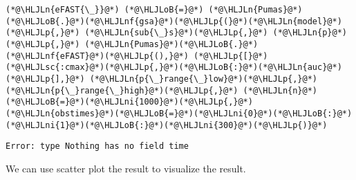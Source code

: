 \documentclass[12pt,a4paper]{article}
\newcommand{\HLJLn}[1]{#1}
\newcommand{\HLJLnf}[1]{\textcolor[RGB]{66,102,213}{#1}}
\newcommand{\HLJLsc}[1]{\textcolor[RGB]{201,61,57}{#1}}
\newcommand{\HLJLni}[1]{\textcolor[RGB]{59,151,46}{#1}}
\newcommand{\HLJLoB}[1]{\textcolor[RGB]{102,102,102}{\textbf{#1}}}
\newcommand{\HLJLp}[1]{#1}
\begin{document}
\begin{lstlisting}
(*@\HLJLn{eFAST{\_}}@*) (*@\HLJLoB{=}@*) (*@\HLJLn{Pumas}@*)(*@\HLJLoB{.}@*)(*@\HLJLnf{gsa}@*)(*@\HLJLp{(}@*)(*@\HLJLn{model}@*)(*@\HLJLp{,}@*) (*@\HLJLn{sub{\_}s}@*)(*@\HLJLp{,}@*) (*@\HLJLn{p}@*)(*@\HLJLp{,}@*) (*@\HLJLn{Pumas}@*)(*@\HLJLoB{.}@*)(*@\HLJLnf{eFAST}@*)(*@\HLJLp{(),}@*) (*@\HLJLp{[}@*)(*@\HLJLsc{:cmax}@*)(*@\HLJLp{,}@*)(*@\HLJLoB{:}@*)(*@\HLJLn{auc}@*)(*@\HLJLp{],}@*) (*@\HLJLn{p{\_}range{\_}low}@*)(*@\HLJLp{,}@*) (*@\HLJLn{p{\_}range{\_}high}@*)(*@\HLJLp{,}@*) (*@\HLJLn{n}@*)(*@\HLJLoB{=}@*)(*@\HLJLni{1000}@*)(*@\HLJLp{,}@*) (*@\HLJLn{obstimes}@*)(*@\HLJLoB{=}@*)(*@\HLJLni{0}@*)(*@\HLJLoB{:}@*)(*@\HLJLni{1}@*)(*@\HLJLoB{:}@*)(*@\HLJLni{300}@*)(*@\HLJLp{)}@*)
\end{lstlisting}

\begin{lstlisting}
Error: type Nothing has no field time
\end{lstlisting}


We can use scatter plot the result to visualize the result.
\end{document}
